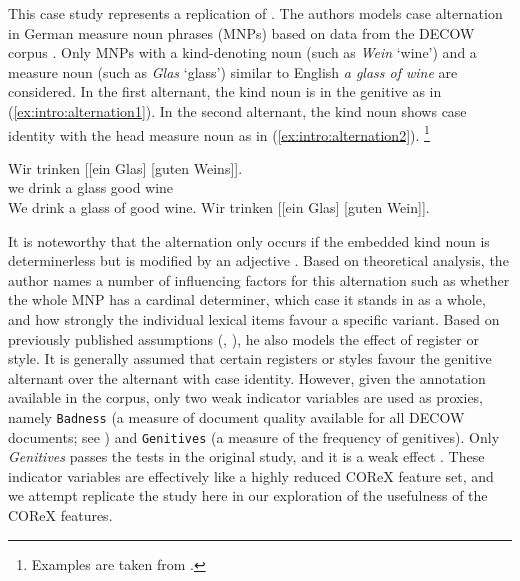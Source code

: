This case study represents a replication of \citet{Schaefer2018}.
The authors models case alternation in German measure noun phrases (MNPs) based on data from the DECOW corpus \citep{SchaeferBildhauer2012}.
Only MNPs with a kind-denoting noun (such as \textit{Wein} `wine') and a measure noun (such as \textit{Glas} `glass') similar to English \textit{a glass of wine} are considered.
In the first alternant, the kind noun is in the genitive as in (\ref{ex:intro:alternation1}).
In the second alternant, the kind noun shows case identity with the head measure noun as in (\ref{ex:intro:alternation2}).%
\footnote{Examples are taken from \citet[735]{Schaefer2018}.}

\begin{exe}
  \ex\label{ex:intro:alternation}
  \begin{xlist}
    \ex \gll Wir trinken [[ein Glas] [guten Weins]].\\
    we drink a glass good wine \\
    \trans We drink a glass of good wine.\label{ex:intro:alternation1}
    \ex Wir trinken [[ein Glas] [guten Wein]].\label{ex:intro:alternation2}
  \end{xlist}
\end{exe}

It is noteworthy that the alternation only occurs if the embedded kind noun is determinerless but is modified by an adjective \citep[737--738]{Schaefer2018}.
Based on theoretical analysis, the author names a number of influencing factors for this alternation such as whether the whole MNP has a cardinal determiner, which case it stands in as a whole, and how strongly the individual lexical items favour a specific variant.
Based on previously published assumptions (\eg, \citealt{Hentschel1993,Zimmer2015}), he also models the effect of register or style.
It is generally assumed that certain registers or styles favour the genitive alternant over the alternant with case identity.
However, given the annotation available in the corpus, only two weak indicator variables are used as proxies, namely \texttt{Badness} (a measure of document quality available for all DECOW documents; see \citealt{SchaeferEa2013}) and \texttt{Genitives} (a measure of the frequency of genitives).
Only \textit{Genitives} passes the tests in the original study, and it is a weak effect \citep[749--751]{Schaefer2018}.
These indicator variables are effectively like a highly reduced COReX feature set, and we attempt replicate the study here in our exploration of the usefulness of the COReX features.
